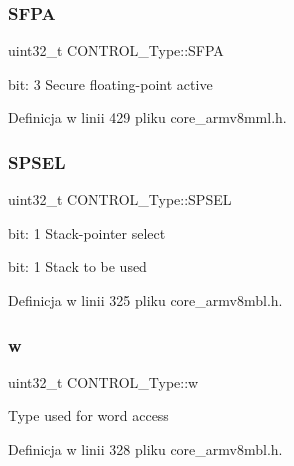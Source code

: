 \subsubsection{\texorpdfstring{S\+F\+PA}{SFPA}}
{\footnotesize\ttfamily uint32\+\_\+t C\+O\+N\+T\+R\+O\+L\+\_\+\+Type\+::\+S\+F\+PA}

bit\+: 3 Secure floating-\/point active 

Definicja w linii 429 pliku core\+\_\+armv8mml.\+h.

\mbox{\label{union_c_o_n_t_r_o_l___type_a8cc085fea1c50a8bd9adea63931ee8e2}} 
\subsubsection{\texorpdfstring{S\+P\+S\+EL}{SPSEL}}
{\footnotesize\ttfamily uint32\+\_\+t C\+O\+N\+T\+R\+O\+L\+\_\+\+Type\+::\+S\+P\+S\+EL}

bit\+: 1 Stack-\/pointer select

bit\+: 1 Stack to be used 

Definicja w linii 325 pliku core\+\_\+armv8mbl.\+h.

\mbox{\label{union_c_o_n_t_r_o_l___type_a6b642cca3d96da660b1198c133ca2a1f}} 
\subsubsection{\texorpdfstring{w}{w}}
{\footnotesize\ttfamily uint32\+\_\+t C\+O\+N\+T\+R\+O\+L\+\_\+\+Type\+::w}

Type used for word access 

Definicja w linii 328 pliku core\+\_\+armv8mbl.\+h.



